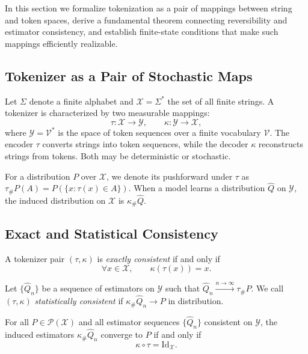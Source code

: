 In this section we formalize tokenization as a pair of mappings between
string and token spaces, derive a fundamental theorem connecting
reversibility and estimator consistency, and establish finite-state
conditions that make such mappings efficiently realizable.

\subsection{Tokenizer as a Pair of Stochastic Maps}

Let $\Sigma$ denote a finite alphabet and
$\mathcal{X}=\Sigma^{*}$ the set of all finite strings.
A tokenizer is characterized by two measurable mappings:
\[
\tau:\mathcal{X}\to\mathcal{Y},\qquad
\kappa:\mathcal{Y}\to\mathcal{X},
\]
where $\mathcal{Y}=\mathcal{V}^{*}$ is the space of token sequences over a
finite vocabulary $\mathcal{V}$.
The encoder $\tau$ converts strings into token sequences,
while the decoder $\kappa$ reconstructs strings from tokens.
Both may be deterministic or stochastic.

For a distribution $P$ over $\mathcal{X}$, we denote its
pushforward under $\tau$ as
$\tau_{\#}P(A)=P(\{x:\tau(x)\in A\})$.
When a model learns a distribution $\hat Q$ on $\mathcal{Y}$,
the induced distribution on $\mathcal{X}$ is
$\kappa_{\#}\hat Q$.

\subsection{Exact and Statistical Consistency}

\begin{definition}
A tokenizer pair $(\tau,\kappa)$ is \emph{exactly consistent}
if and only if
\[
\forall x\in\mathcal{X},\qquad
\kappa(\tau(x))=x.
\]
\end{definition}

\begin{definition}
Let $\{\hat Q_n\}$ be a sequence of estimators on $\mathcal{Y}$ such that
$\hat Q_n\xrightarrow{n\to\infty}\tau_{\#}P$.
We call $(\tau,\kappa)$ \emph{statistically consistent}
if $\kappa_{\#}\hat Q_n \to P$ in distribution.
\end{definition}

\begin{theorem}
\label{thm:consistency}
For all $P\in\mathcal{P}(\mathcal{X})$ and all estimator sequences
$\{\hat Q_n\}$ consistent on $\mathcal{Y}$,
the induced estimators $\kappa_{\#}\hat Q_n$
converge to $P$ if and only if
\[
\kappa\!\circ\!\tau = \mathrm{Id}_{\mathcal{X}}.
\]
\end{theorem}

